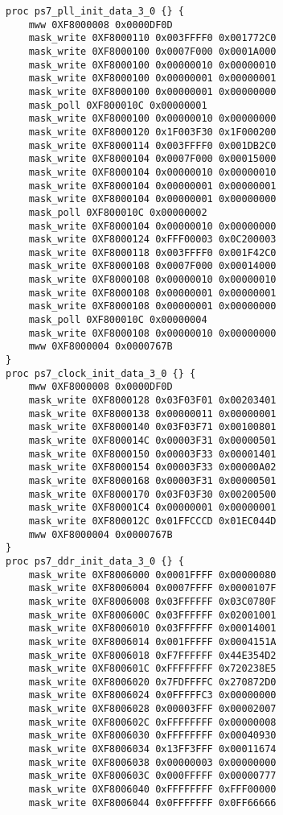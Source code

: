 \begin{lstlisting}
proc ps7_pll_init_data_3_0 {} {
	mww 0XF8000008 0x0000DF0D
    mask_write 0XF8000110 0x003FFFF0 0x001772C0
    mask_write 0XF8000100 0x0007F000 0x0001A000
    mask_write 0XF8000100 0x00000010 0x00000010
    mask_write 0XF8000100 0x00000001 0x00000001
    mask_write 0XF8000100 0x00000001 0x00000000
    mask_poll 0XF800010C 0x00000001
    mask_write 0XF8000100 0x00000010 0x00000000
    mask_write 0XF8000120 0x1F003F30 0x1F000200
    mask_write 0XF8000114 0x003FFFF0 0x001DB2C0
    mask_write 0XF8000104 0x0007F000 0x00015000
    mask_write 0XF8000104 0x00000010 0x00000010
    mask_write 0XF8000104 0x00000001 0x00000001
    mask_write 0XF8000104 0x00000001 0x00000000
    mask_poll 0XF800010C 0x00000002
    mask_write 0XF8000104 0x00000010 0x00000000
    mask_write 0XF8000124 0xFFF00003 0x0C200003
    mask_write 0XF8000118 0x003FFFF0 0x001F42C0
    mask_write 0XF8000108 0x0007F000 0x00014000
    mask_write 0XF8000108 0x00000010 0x00000010
    mask_write 0XF8000108 0x00000001 0x00000001
    mask_write 0XF8000108 0x00000001 0x00000000
    mask_poll 0XF800010C 0x00000004
    mask_write 0XF8000108 0x00000010 0x00000000
	mww 0XF8000004 0x0000767B
}
proc ps7_clock_init_data_3_0 {} {
	mww 0XF8000008 0x0000DF0D
    mask_write 0XF8000128 0x03F03F01 0x00203401
    mask_write 0XF8000138 0x00000011 0x00000001
    mask_write 0XF8000140 0x03F03F71 0x00100801
    mask_write 0XF800014C 0x00003F31 0x00000501
    mask_write 0XF8000150 0x00003F33 0x00001401
    mask_write 0XF8000154 0x00003F33 0x00000A02
    mask_write 0XF8000168 0x00003F31 0x00000501
    mask_write 0XF8000170 0x03F03F30 0x00200500
    mask_write 0XF80001C4 0x00000001 0x00000001
    mask_write 0XF800012C 0x01FFCCCD 0x01EC044D
	mww 0XF8000004 0x0000767B
}
proc ps7_ddr_init_data_3_0 {} {
    mask_write 0XF8006000 0x0001FFFF 0x00000080
    mask_write 0XF8006004 0x0007FFFF 0x0000107F
    mask_write 0XF8006008 0x03FFFFFF 0x03C0780F
    mask_write 0XF800600C 0x03FFFFFF 0x02001001
    mask_write 0XF8006010 0x03FFFFFF 0x00014001
    mask_write 0XF8006014 0x001FFFFF 0x0004151A
    mask_write 0XF8006018 0xF7FFFFFF 0x44E354D2
    mask_write 0XF800601C 0xFFFFFFFF 0x720238E5
    mask_write 0XF8006020 0x7FDFFFFC 0x270872D0
    mask_write 0XF8006024 0x0FFFFFC3 0x00000000
    mask_write 0XF8006028 0x00003FFF 0x00002007
    mask_write 0XF800602C 0xFFFFFFFF 0x00000008
    mask_write 0XF8006030 0xFFFFFFFF 0x00040930
    mask_write 0XF8006034 0x13FF3FFF 0x00011674
    mask_write 0XF8006038 0x00000003 0x00000000
    mask_write 0XF800603C 0x000FFFFF 0x00000777
    mask_write 0XF8006040 0xFFFFFFFF 0xFFF00000
    mask_write 0XF8006044 0x0FFFFFFF 0x0FF66666

\end{lstlisting}
